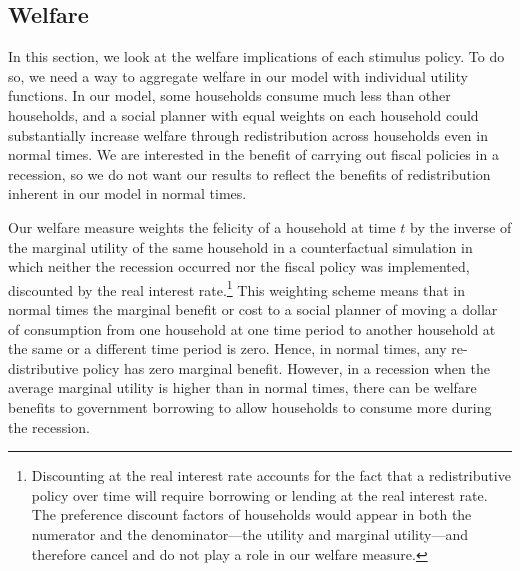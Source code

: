 \documentclass[../HAFiscal]{subfiles}
\begin{document}
\subsection{Welfare}
\whenintegrated{\label{sec:welfare}} 

In this section, we look at the welfare implications of each stimulus policy.
To do so, we need a way to aggregate welfare in our model with individual utility functions.
In our model, some households consume much less than other households, and a social planner with equal weights on each household could substantially increase welfare through redistribution across households even in normal times.
We are interested in the benefit of carrying out fiscal policies in a recession, so we do not want our results to reflect the benefits of redistribution inherent in our model in normal times.

Our welfare measure weights the felicity of a household at time $t$ by the inverse of the marginal utility of the same household in a counterfactual simulation in which neither the recession occurred nor the fiscal policy was implemented, discounted by the real interest rate.\footnote{Discounting at the real interest rate accounts for the fact that a redistributive policy over time will require borrowing or lending at the real interest rate.
  The preference discount factors of households would appear in both the numerator and the denominator---the utility and marginal utility---and therefore cancel and do not play a role in our welfare measure.} This weighting scheme means that in normal times the marginal benefit or cost to a social planner of moving a dollar of consumption from one household at one time period to another household at the same or a different time period is zero.
Hence, in normal times, any re-distributive policy has zero marginal benefit.
However, in a recession when the average marginal utility is higher than in normal times, there can be welfare benefits to government borrowing to allow households to consume more during the recession.
\end{document}
